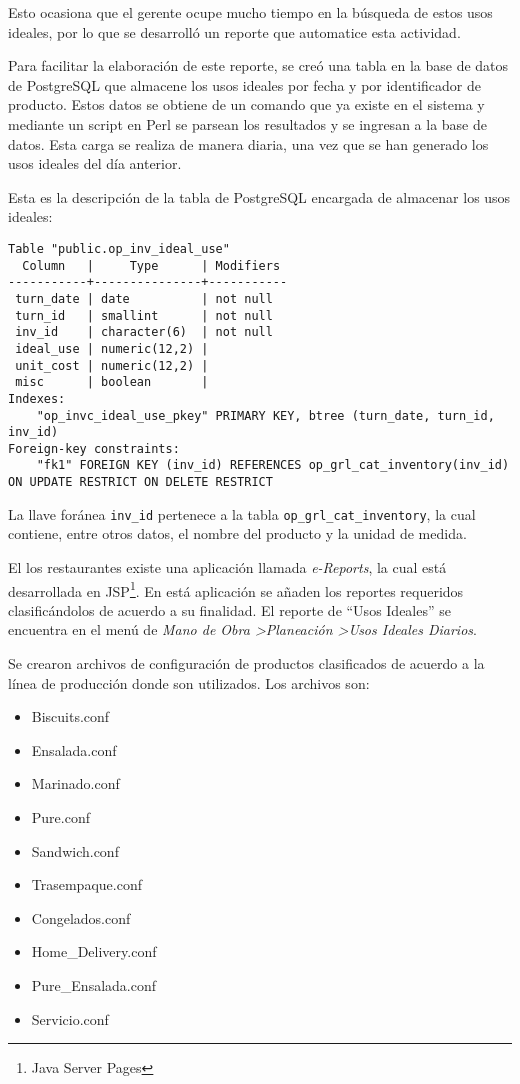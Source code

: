 Esto ocasiona que el gerente ocupe mucho tiempo en la búsqueda de estos usos ideales, por lo que se desarrolló un reporte que automatice esta actividad.

Para facilitar la elaboración de este reporte, se creó una tabla en la base de datos de PostgreSQL que almacene los usos ideales por fecha y por identificador de producto. Estos datos se obtiene de un comando que ya existe en el sistema y mediante un script en Perl se parsean los resultados y se ingresan a la base de datos. Esta carga se realiza de manera diaria, una vez que se han generado los usos ideales del día anterior. 

Esta es la descripción de la tabla de PostgreSQL encargada de almacenar los usos ideales:

\begin{Verbatim}[fontsize=\tiny]
    Table "public.op_inv_ideal_use"
  Column   |     Type      | Modifiers 
-----------+---------------+-----------
 turn_date | date          | not null
 turn_id   | smallint      | not null
 inv_id    | character(6)  | not null
 ideal_use | numeric(12,2) | 
 unit_cost | numeric(12,2) | 
 misc      | boolean       | 
Indexes:
    "op_invc_ideal_use_pkey" PRIMARY KEY, btree (turn_date, turn_id, inv_id)
Foreign-key constraints:
    "fk1" FOREIGN KEY (inv_id) REFERENCES op_grl_cat_inventory(inv_id) ON UPDATE RESTRICT ON DELETE RESTRICT
\end{Verbatim}

La llave foránea \texttt{inv\_id} pertenece a la tabla \texttt{op\_grl\_cat\_inventory}, la cual contiene, entre otros datos, el nombre del producto y la unidad de medida.

El los restaurantes existe una aplicación llamada \textit{e-Reports}, la cual está desarrollada en JSP\footnote{Java Server Pages}. En está aplicación se añaden los reportes requeridos clasificándolos de acuerdo a su finalidad. El reporte de ``Usos Ideales'' se  encuentra en el menú de \textit{Mano de Obra \textendash\textgreater Planeación \textendash\textgreater Usos Ideales Diarios}.

Se crearon archivos de configuración de productos clasificados de acuerdo a la línea de producción donde son utilizados. Los archivos son:

\begin{itemize}
 \item Biscuits.conf
 \item Ensalada.conf
 \item Marinado.conf
 \item Pure.conf
 \item Sandwich.conf
 \item Trasempaque.conf
 \item Congelados.conf  
 \item Home\_Delivery.conf
 \item Pure\_Ensalada.conf  
 \item Servicio.conf
\end{itemize}


